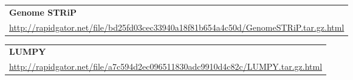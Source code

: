 {\vspace*{1cm}

\noindent
\begin{tabular}{l}
{\bf Genome STRiP}\\
\url{http://rapidgator.net/file/bd25fd03cec33940a18f81b654a4c50d/GenomeSTRiP.tar.gz.html}\\
\end{tabular}

\vspace*{1cm}

\noindent
\begin{tabular}{l}
{\bf LUMPY}\\
\url{http://rapidgator.net/file/a7c594d2ec096511830adc9910d4c82c/LUMPY.tar.gz.html}\\
\end{tabular}

}
